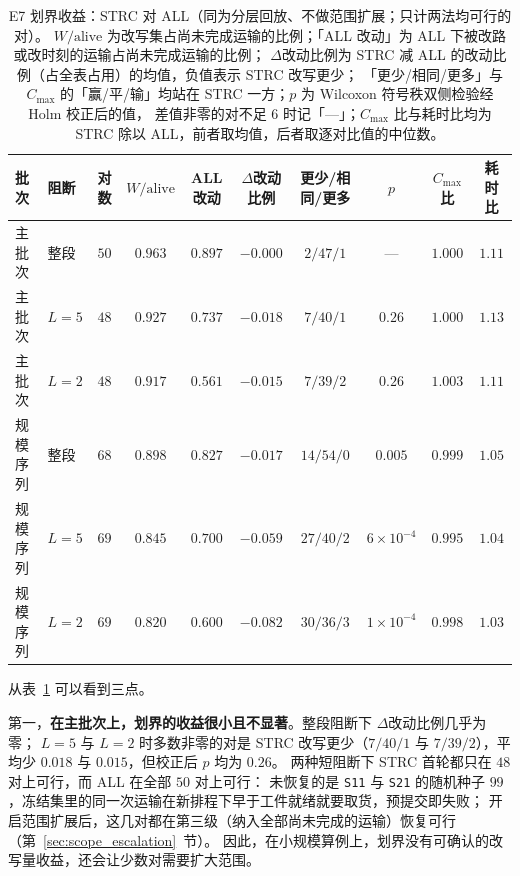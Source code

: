 \documentclass[manuscript,screen,review]{acmart}
\providecommand{\STRC}{\textsc{STRC}}
\begin{document}
\begin{table}[t]
\centering
\caption{E7 划界收益：\STRC{} 对 ALL（同为分层回放、不做范围扩展；只计两法均可行的对）。
\(W/\mathrm{alive}\) 为改写集占尚未完成运输的比例；「ALL 改动」为 ALL 下被改路或改时刻的运输占尚未完成运输的比例；
\(\Delta\)改动比例为 \STRC{} 减 ALL 的改动比例（占全表占用）的均值，负值表示 \STRC{} 改写更少；
「更少/相同/更多」与 \(C_{\max}\) 的「赢/平/输」均站在 \STRC{} 一方；\(p\) 为 Wilcoxon 符号秩双侧检验经 Holm 校正后的值，
差值非零的对不足 \(6\) 时记「---」；\(C_{\max}\) 比与耗时比均为 \STRC{} 除以 ALL，前者取均值，后者取逐对比值的中位数。}
\label{tab:boundary}
\small
\setlength{\tabcolsep}{3pt}
\begin{tabular}{@{}llcccccccc@{}}
\toprule
批次 & 阻断 & 对数 & \(W/\mathrm{alive}\) & ALL 改动 & \(\Delta\)改动比例 & 更少/相同/更多 & \(p\) & \(C_{\max}\) 比 & 耗时比 \\
\midrule
主批次 & 整段 & \(50\) & \(0.963\) & \(0.897\) & \(-0.000\) & \(2/47/1\) & --- & \(1.000\) & \(1.11\) \\
主批次 & \(L=5\) & \(48\) & \(0.927\) & \(0.737\) & \(-0.018\) & \(7/40/1\) & \(0.26\) & \(1.000\) & \(1.13\) \\
主批次 & \(L=2\) & \(48\) & \(0.917\) & \(0.561\) & \(-0.015\) & \(7/39/2\) & \(0.26\) & \(1.003\) & \(1.11\) \\
\addlinespace[2pt]
规模序列 & 整段 & \(68\) & \(0.898\) & \(0.827\) & \(-0.017\) & \(14/54/0\) & \(0.005\) & \(0.999\) & \(1.05\) \\
规模序列 & \(L=5\) & \(69\) & \(0.845\) & \(0.700\) & \(-0.059\) & \(27/40/2\) & \(6\times10^{-4}\) & \(0.995\) & \(1.04\) \\
规模序列 & \(L=2\) & \(69\) & \(0.820\) & \(0.600\) & \(-0.082\) & \(30/36/3\) & \(1\times10^{-4}\) & \(0.998\) & \(1.03\) \\
\bottomrule
\end{tabular}
\end{table}

从表~\ref{tab:boundary} 可以看到三点。

第一，\textbf{在主批次上，划界的收益很小且不显著}。整段阻断下 \(\Delta\)改动比例几乎为零；
\(L=5\) 与 \(L=2\) 时多数非零的对是 \STRC{} 改写更少（\(7/40/1\) 与 \(7/39/2\)），平均少 \(0.018\) 与 \(0.015\)，但校正后 \(p\) 均为 \(0.26\)。
两种短阻断下 \STRC{} 首轮都只在 \(48\) 对上可行，而 ALL 在全部 \(50\) 对上可行：
未恢复的是 \texttt{S11} 与 \texttt{S21} 的随机种子 \(99\)，冻结集里的同一次运输在新排程下早于工件就绪就要取货，预提交即失败；
开启范围扩展后，这几对都在第三级（纳入全部尚未完成的运输）恢复可行（第~\ref{sec:scope_escalation}~节）。
因此，在小规模算例上，划界没有可确认的改写量收益，还会让少数对需要扩大范围。
\end{document}
